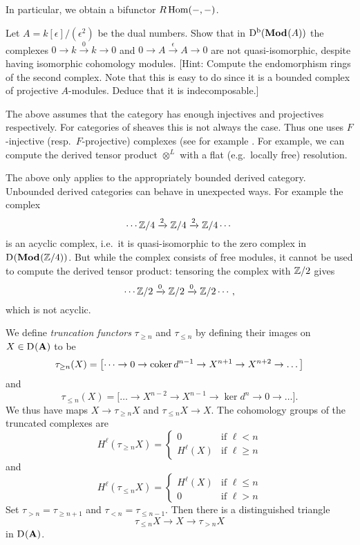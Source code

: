 \documentclass[number-in-sections,a4paper]{notes}
\begin{document}
In particular, we obtain a bifunctor $R\operatorname{Hom}(-,-)$.

\begin{Exercise}
    Let $A = k[\epsilon]/(\epsilon^2)$ be the dual numbers.
    Show that in $\catDb{\catModules{A}}$ the complexes $0 \to k \xrightarrow{0} k \to 0$ and $0 \to A \xrightarrow{\epsilon} A \to 0$ are not quasi-isomorphic, despite having isomorphic cohomology modules.
    [Hint: Compute the endomorphism rings of the second complex. Note that this is easy to do since it is a bounded complex of projective $A$-modules. Deduce that it is indecomposable.]
\end{Exercise}

The above assumes that the category has enough injectives and projectives respectively.
For categories of sheaves this is not always the case.
Thus one uses $F$-injective (resp.~$F$-projective) complexes (see for example \cite[Theorem~10.5.9]{Weibel:1996:IntroductionToHomologicalAlgebra}.
For example, we can compute the derived tensor product $\otimes^L$ with a flat (e.g.~locally free) resolution.

\begin{Warning}
    The above only applies to the appropriately bounded derived category.
    Unbounded derived categories can behave in unexpected ways.
    For example the complex
    \[
        \cdots {\mathbb{Z}}/4 \xrightarrow{2} {\mathbb{Z}}/4 \xrightarrow{2} {\mathbb{Z}}/4 \cdots
    \]
    is an acyclic complex, i.e.~it is quasi-isomorphic to the zero complex in $\catD{\catModules{\ZZ/4}}$.
    But while the complex consists of free modules, it cannot be used to compute the derived tensor product:
    tensoring the complex with ${\mathbb{Z}}/2$ gives
    \[
        \cdots {\mathbb{Z}}/2 \xrightarrow{0} {\mathbb{Z}}/2 \xrightarrow{0} {\mathbb{Z}}/2 \cdots,
    \]
    which is not acyclic.
\end{Warning}

We define \emph{truncation functors} $\tau_{\ge n}$ and $\tau_{\le n}$ by defining their images on $X \in \mathrm{D}^{}(\mathbf A)$ to be
\[
    \tau_{\ge n}(X) = \bigl[ \dots \to 0 \to \operatorname{coker}{d^{n-1}} \to X^{n+1} \to X^{n+2} \to \dots \bigr]
\]
and
\[
    \tau_{\le n}(X) = \bigl[ \dots \to X^{n-2} \to X^{n-1} \to \ker d^{n} \to 0 \to \dots \bigr].
\]
We thus have maps $X \to \tau_{\ge n}X$ and $\tau_{\le n}X \to X$.
The cohomology groups of the truncated complexes are
\[
    H^\ell(\tau_{\ge n}X) =
    \begin{cases}
        0 & \text{if } \ell < n \\
        H^\ell(X) & \text{if } \ell \ge n
    \end{cases}
\]
and
\[
    H^\ell(\tau_{\le n}X) =
    \begin{cases}
        H^\ell(X) & \text{if } \ell \le n \\
        0 & \text{if } \ell > n
    \end{cases}
\]
Set $\tau_{>n} = \tau_{\ge n+1}$ and $\tau_{<n} = \tau_{\le n-1}$.
Then there is a distinguished triangle
\[
    \tau_{\le n}X \to X \to \tau_{>n} X
\]
in $\mathrm{D}^{}(\mathbf A)$.

\printbibliography
\end{document}
